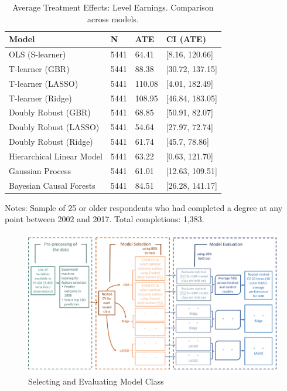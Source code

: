 \documentclass[12pt, a4paper]{article}
\begin{document}
\begin{table}[H]
\centering
\small
\caption{Average Treatment Effects: Level Earnings. Comparison across models.}
\begin{tabular}{p{} C{0.1\textwidth} C{0.1\textwidth} C{0.2\textwidth}}
\toprule
Model  &  N  &  ATE  &  CI (ATE)  \\
\midrule 	   						
OLS (S-learner)	 & 	5441	 & 	64.41	 & 	[8.16, 120.66]	 \\
T-learner (GBR)	 & 	5441	 & 	88.38	 & 	[30.72, 137.15]	 \\
T-learner (LASSO)	 & 	5441	 & 	110.08	 & 	[4.01, 182.49]	 \\
T-learner (Ridge)	 & 	5441	 & 	108.95	 & 	[46.84, 183.05]	 \\
Doubly Robust (GBR)	 & 	5441	 & 	68.85	 & [50.91, 82.07] \\
Doubly Robust (LASSO)	 & 	5441	 & 	54.64	 & 	[27.97, 72.74]	 \\
Doubly Robust (Ridge)	 & 	5441	 & 	61.74	 & 	[45.7, 78.86]	 \\
Hierarchical Linear Model	 & 	5441	 & 	63.22 & [0.63, 121.70]  \\
Gaussian Process  & 	5441	 & 	61.01	 & 	[12.63, 109.51]	 \\
Bayesian Causal Forests  & 5441 & 84.51 & [26.28, 141.17] \\
\bottomrule
\end{tabular}
\par\medskip
\parbox{1.0\textwidth}{\footnotesize Notes: Sample of 25 or older respondents who had completed a degree at any point between 2002 and 2017. Total completions: 1,383.}
\label{tab:atebslvl}
\end{table}



\begin{figure}[H]
\centering
\caption{Selecting and Evaluating Model Class}
  \label{fig:exp_model}
    \includegraphics[scale=0.5]{_figures/explainer1.pdf}
\end{figure}
\end{document}
